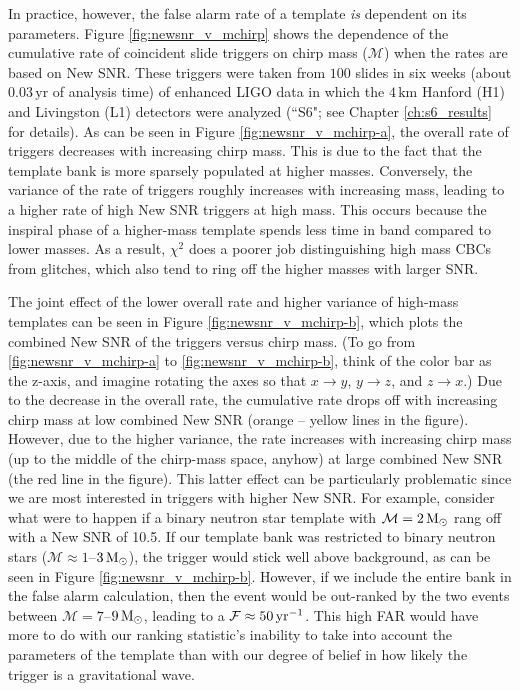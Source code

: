 In practice, however, the false alarm rate of a template \emph{is} dependent on its parameters. Figure \ref{fig:newsnr_v_mchirp} shows the dependence of the cumulative rate of coincident slide triggers on chirp mass ($\mathcal{M}$) when the rates are based on New \ac{SNR}. These triggers were taken from $100$ slides in six weeks (about $0.03\,\mathrm{yr}$ of analysis time) of enhanced \ac{LIGO} data in which the $4\,\mathrm{km}$ Hanford (H1) and Livingston (L1) detectors were analyzed (``S6"; see Chapter \ref{ch:s6_results} for details). As can be seen in Figure \ref{fig:newsnr_v_mchirp-a}, the overall rate of triggers decreases with increasing chirp mass. This is due to the fact that the template bank is more sparsely populated at higher masses. Conversely, the variance of the rate of triggers roughly increases with increasing mass, leading to a higher rate of high New \ac{SNR} triggers at high mass. This occurs because the inspiral phase of a higher-mass template spends less time in band compared to lower masses. As a result, $\chi^2$ does a poorer job distinguishing high mass \acp{CBC} from glitches, which also tend to ring off the higher masses with larger \ac{SNR}.

The joint effect of the lower overall rate and higher variance of high-mass templates can be seen in Figure \ref{fig:newsnr_v_mchirp-b}, which plots the combined New \ac{SNR} of the triggers versus chirp mass. (To go from \ref{fig:newsnr_v_mchirp-a} to \ref{fig:newsnr_v_mchirp-b}, think of the color bar as the z-axis, and imagine rotating the axes so that $x \rightarrow y$, $y \rightarrow z$, and $z \rightarrow x$.) Due to the decrease in the overall rate, the cumulative rate drops off with increasing chirp mass at low combined New \ac{SNR} (orange -- yellow lines in the figure). However, due to the higher variance, the rate increases with increasing chirp mass (up to the middle of the chirp-mass space, anyhow) at large combined New \ac{SNR} (the red line in the figure). This latter effect can be particularly problematic since we are most interested in triggers with higher New \ac{SNR}. For example, consider what were to happen if a binary neutron star template with $\mathcal{M} = 2\,\mathrm{M_\odot}$ rang off with a New \ac{SNR} of 10.5. If our template bank was restricted to binary neutron stars ($\mathcal{M} \approx 1$--$3\,\mathrm{M_\odot}$), the trigger would stick well above background, as can be seen in Figure \ref{fig:newsnr_v_mchirp-b}. However, if we include the entire bank in the false alarm calculation, then the event would be out-ranked by the two events between $\mathcal{M} = 7$--$9\,\mathrm{M_\odot}$, leading to a $\mathcal{F} \approx 50\,\mathrm{yr}^{-1}$. This high \ac{FAR} would have more to do with our ranking statistic's inability to take into account the parameters of the template than with our degree of belief in how likely the trigger is a gravitational wave.

